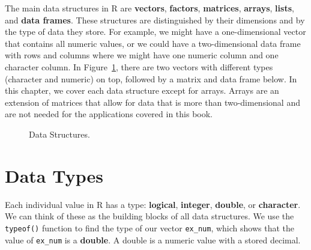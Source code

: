 \documentclass[
  letterpaper,
]{latex/krantz}
\begin{document}
The main data structures in R are \textbf{vectors}, \textbf{factors},
\textbf{matrices}, \textbf{arrays}, \textbf{lists}, and \textbf{data
frames}. These structures are distinguished by their dimensions and by
the type of data they store. For example, we might have a
one-dimensional vector that contains all numeric values, or we could
have a two-dimensional data frame with rows and columns where we might
have one numeric column and one character column. In
Figure~\ref{fig-data-structures}, there are two vectors with different
types (character and numeric) on top, followed by a matrix and data
frame below. In this chapter, we cover each data structure except for
arrays. Arrays are an extension of matrices that allow for data that is
more than two-dimensional and are not needed for the applications
covered in this book.

\begin{figure}


\caption{\label{fig-data-structures}Data Structures.}

\end{figure}%

\section{\texorpdfstring{Data Types
}{Data Types }}\label{data-types}

Each individual value in R has a type: \textbf{logical},
\textbf{integer}, \textbf{double}, or \textbf{character}. We can think
of these as the building blocks of all data structures. We use the
\texttt{typeof()} function
to find the type of our vector \texttt{ex\_num}, which shows that the
value of \texttt{ex\_num} is a \textbf{double}.
A double is a numeric value with a stored decimal.
\end{document}
